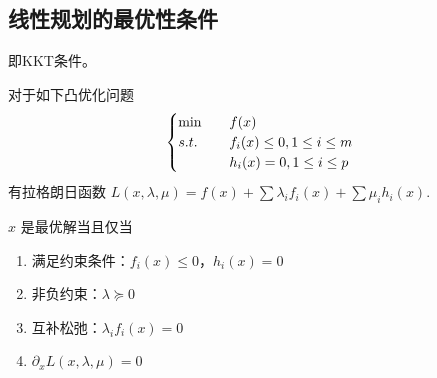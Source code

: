 \subsection{线性规划的最优性条件}
即KKT条件。

对于如下凸优化问题
\[
    \begin{cases}
        \min \quad &f(x)\\
        s.t. \quad &f_i(x) \le 0, 1 \le i \le m\\
        &h_i(x) = 0, 1 \le i \le p
    \end{cases}    
\]
有拉格朗日函数 $L(x, \lambda, \mu) = f(x) + \sum \lambda_if_i(x) + \sum \mu_ih_i(x)$.

$x$ 是最优解当且仅当
\begin{enumerate}
    \item 满足约束条件：$f_i(x) \le 0$，$h_i(x) = 0$
    \item 非负约束：$\lambda \succeq 0$
    \item 互补松弛：$\lambda_if_i(x) = 0$
    \item $\partial_xL(x, \lambda, \mu) = 0$
\end{enumerate}
